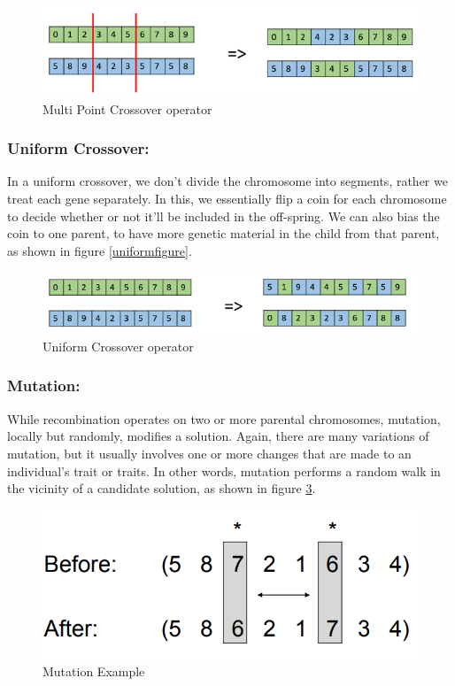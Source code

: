 \begin{figure}[h]
	\centering
	\includegraphics[scale=0.45]{imagenes/multi_point_crossover.png}
    \caption{Multi Point Crossover operator}
    \label{MultiPointfigure}
\end{figure}

\subsubsection{Uniform Crossover:}
In a uniform crossover, we don’t divide the chromosome into segments, rather we treat each gene separately. In this, we essentially flip a coin for each chromosome to decide whether or not it’ll be included in the off-spring. We can also bias the coin to one parent, to have more genetic material in the child from that parent, as shown in figure \ref{uniformfigure}.

\begin{figure}[h]
	\centering
	\includegraphics[scale=0.45]{imagenes/uniform_crossover.png}
    \caption{Uniform Crossover operator}
    \label{uniform}
\end{figure}

\subsubsection{Mutation:}
While recombination operates on two or more parental chromosomes,
mutation, locally but randomly, modifies a solution. Again, there are many variations of mutation, but it usually involves one or more changes that are made to
an individual’s trait or traits. In other words, mutation performs a random walk
in the vicinity of a candidate solution, as shown in figure \ref{mutation}.

\begin{figure}[h]
	\centering
	\includegraphics[scale=0.45]{imagenes/mutation.png}
    \caption{Mutation Example}
    \label{mutation}
\end{figure}

